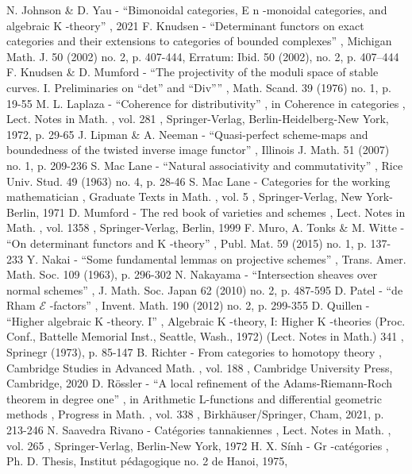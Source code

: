 N. Johnson \& D. Yau - “Bimonoidal categories, E n -monoidal categories, and algebraic K -theory” , 2021
 F. Knudsen - “Determinant functors on exact categories and their extensions to categories of bounded complexes” , Michigan Math. J. 50 (2002) no. 2, p. 407-444, Erratum: Ibid. 50 (2002), no. 2, p. 407–444
 F. Knudsen \& D. Mumford - “The projectivity of the moduli space of stable curves. I. Preliminaries on “det” and “Div”” , Math. Scand. 39 (1976) no. 1, p. 19-55
 M. L. Laplaza - “Coherence for distributivity” , in Coherence in categories , Lect. Notes in Math. , vol. 281 , Springer-Verlag, Berlin-Heidelberg-New York, 1972, p. 29-65
 J. Lipman \& A. Neeman - “Quasi-perfect scheme-maps and boundedness of the twisted inverse image functor” , Illinois J. Math. 51 (2007) no. 1, p. 209-236
 S. Mac Lane - “Natural associativity and commutativity” , Rice Univ. Stud. 49 (1963) no. 4, p. 28-46
 S. Mac Lane - Categories for the working mathematician , Graduate Texts in Math. , vol. 5 , Springer-Verlag, New York-Berlin, 1971
 D. Mumford - The red book of varieties and schemes , Lect. Notes in Math. , vol. 1358 , Springer-Verlag, Berlin, 1999
 F. Muro, A. Tonks \& M. Witte - “On determinant functors and K -theory” , Publ. Mat. 59 (2015) no. 1, p. 137-233
 Y. Nakai - “Some fundamental lemmas on projective schemes” , Trans. Amer. Math. Soc. 109 (1963), p. 296-302
 N. Nakayama - “Intersection sheaves over normal schemes” , J. Math. Soc. Japan 62 (2010) no. 2, p. 487-595
 D. Patel - “de Rham $\mathcal{E}$ -factors” , Invent. Math. 190 (2012) no. 2, p. 299-355
 D. Quillen - “Higher algebraic K -theory. I” , Algebraic K -theory, I: Higher K -theories (Proc. Conf., Battelle Memorial Inst., Seattle, Wash., 1972) (Lect. Notes in Math.) 341 , Sprinegr (1973), p. 85-147
 B. Richter - From categories to homotopy theory , Cambridge Studies in Advanced Math. , vol. 188 , Cambridge University Press, Cambridge, 2020
 D. Rössler - “A local refinement of the Adams-Riemann-Roch theorem in degree one” , in Arithmetic L-functions and differential geometric methods , Progress in Math. , vol. 338 , Birkhäuser/Springer, Cham, 2021, p. 213-246
 N. Saavedra Rivano - Catégories tannakiennes , Lect. Notes in Math. , vol. 265 , Springer-Verlag, Berlin-New York, 1972
 H. X. Sính - Gr -catégories , Ph. D. Thesis, Institut pédagogique no. 2 de Hanoi, 1975,
